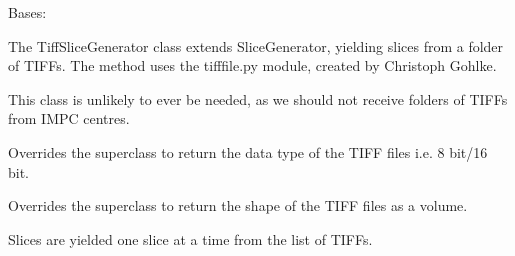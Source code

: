\documentclass[letterpaper,10pt,english]{sphinxmanual}
\begin{document}
\begin{fulllineitems}
\label{SliceGenerator:SliceGenerator.TiffSliceGenerator}
Bases: {\hyperref[SliceGenerator:SliceGenerator.SliceGenerator]{}}

The TiffSliceGenerator class extends SliceGenerator, yielding slices from a folder of TIFFs. The method uses the
tifffile.py module, created by Christoph Gohlke.

This class is unlikely to ever be needed, as we should not receive folders of TIFFs from IMPC centres.

\begin{fulllineitems}
\label{SliceGenerator:SliceGenerator.TiffSliceGenerator.dtype}
Overrides the superclass to return the data type of the TIFF files i.e. 8 bit/16 bit.

\end{fulllineitems}


\begin{fulllineitems}
\label{SliceGenerator:SliceGenerator.TiffSliceGenerator.shape}
Overrides the superclass to return the shape of the TIFF files as a volume.

\end{fulllineitems}


\begin{fulllineitems}
\label{SliceGenerator:SliceGenerator.TiffSliceGenerator.slices}
Slices are yielded one slice at a time from the list of TIFFs.

\end{fulllineitems}


\end{fulllineitems}

\end{document}
